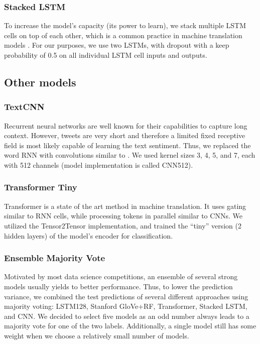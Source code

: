 \documentclass[10pt,conference,compsocconf]{IEEEtran}
\begin{document}
\subsubsection{Stacked LSTM}
To increase the model's capacity (its power to learn), we stack multiple LSTM cells on top of each other, which is a common practice in machine translation models \cite{zeroshot}. For our purposes, we use two LSTMs, with dropout with a keep probability of 0.5 on all individual LSTM cell inputs and outputs.


\subsection{Other models}

\subsubsection{TextCNN}
Recurrent neural networks are well known for their capabilities to capture long context. However, tweets are very short and therefore a limited fixed receptive field is most likely capable of learning the text sentiment. Thus, we replaced the word RNN with convolutions similar to \cite{TextCNN}. We used kernel sizes 3, 4, 5, and 7, each with 512 channels (model implementation is called CNN512).

\subsubsection{Transformer Tiny}
Transformer \cite{transformer} is a state of the art method in machine translation. It uses gating similar to RNN cells, while processing tokens in parallel similar to CNNs. We utilized the Tensor2Tensor \cite{tensor2tensor} implementation, and trained the ``tiny'' version (2 hidden layers) of the model's encoder for classification.

\subsubsection{Ensemble Majority Vote}
Motivated by most data science competitions, an ensemble of several strong models usually yields to better performance. Thus, to lower the prediction variance, we combined the test predictions of several different approaches using majority voting: LSTM128, Stanford GloVe+RF, Transformer, Stacked LSTM, and CNN. We decided to select five models as an odd number always leads to a majority vote for one of the two labels. Additionally, a single model still has some weight when we choose a relatively small number of models.
\end{document}
